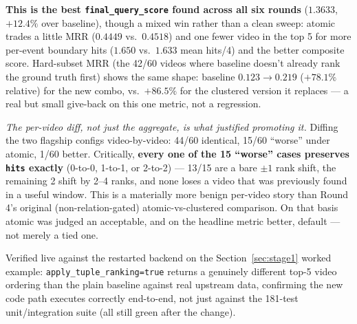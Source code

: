 \documentclass[11pt]{article}
\newcommand{\code}[1]{\texttt{\small #1}}
\begin{document}
\textbf{This is the best \code{final\_query\_score} found across all six rounds} ($1.3633$,
$+12.4\%$ over baseline), though a mixed win rather than a clean sweep: atomic trades a little MRR
($0.4449$ vs.\ $0.4518$) and one fewer video in the top 5 for more per-event boundary hits ($1.650$
vs.\ $1.633$ mean hits/4) and the better composite score. Hard-subset MRR (the 42/60 videos where
baseline doesn't already rank the ground truth first) shows the same shape: baseline $0.123 \to
0.219$ ($+78.1\%$ relative) for the new combo, vs.\ $+86.5\%$ for the clustered version it replaces
--- a real but small give-back on this one metric, not a regression.

\emph{The per-video diff, not just the aggregate, is what justified promoting it.} Diffing the two
flagship configs video-by-video: 44/60 identical, 15/60 ``worse'' under atomic, 1/60 better.
Critically, \textbf{every one of the 15 ``worse'' cases preserves \code{hits} exactly} (0-to-0,
1-to-1, or 2-to-2) --- 13/15 are a bare $\pm1$ rank shift, the remaining 2 shift by 2--4 ranks, and
none loses a video that was previously found in a useful window. This is a materially more benign
per-video story than Round 4's original (non-relation-gated) atomic-vs-clustered comparison. On that
basis atomic was judged an acceptable, and on the headline metric better, default --- not merely a
tied one.

Verified live against the restarted backend on the Section~\ref{sec:stage1} worked example:
\code{apply\_tuple\_ranking=true} returns a genuinely different top-5 video ordering than the plain
baseline against real upstream data, confirming the new code path executes correctly end-to-end, not
just against the 181-test unit/integration suite (all still green after the change).
\end{document}
